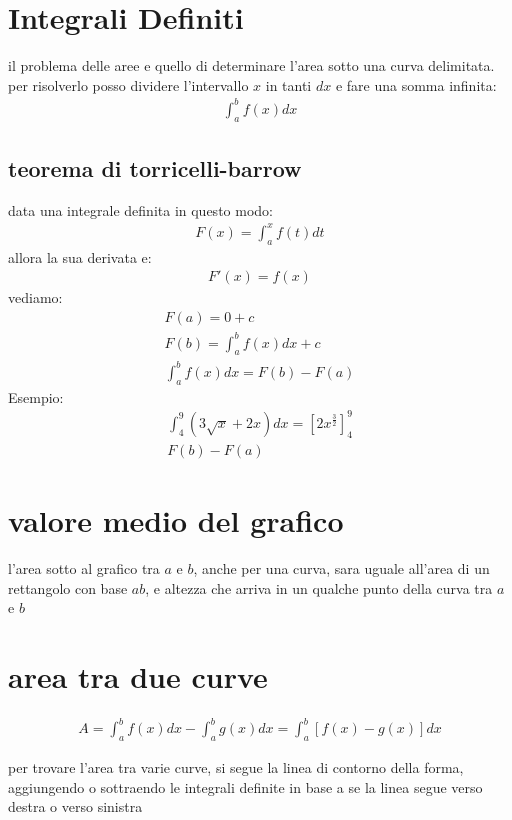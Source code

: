 \documentclass{article}
\begin{document}
\section{Integrali Definiti}
il problema delle aree e quello di determinare l'area sotto una curva delimitata. per risolverlo posso dividere l'intervallo $x$ in tanti $dx$ e fare una somma infinita:
\begin{gather*}
		\int_a^b f(x)dx
\end{gather*}
\subsection{teorema di torricelli-barrow}
data una integrale definita in questo modo:
\begin{gather*}
		F(x)=\int_a^x f(t)dt
\end{gather*}
allora la sua derivata e:
\begin{gather*}
		F'(x)=f(x)
\end{gather*}
vediamo:
\begin{gather*}
		F(a)=0+c\\
		F(b)=\int_a^b f(x)dx +c\\
		\int_a^b f(x)dx=F(b)-F(a)
\end{gather*}
Esempio:
\begin{gather*}
		\int_4^9 (3\sqrt{x}+2x)dx=\left[2x^{\frac{3}{2}}\right]_4^9\\
		F(b)-F(a)
\end{gather*}

\section{valore medio del grafico}

l'area sotto al grafico tra $a$ e $b$, anche per una curva, sara uguale all'area di un rettangolo con base $ab$, e altezza che arriva in un qualche punto della curva tra $a$ e $b$

\section{area tra due curve}

\begin{gather*}
A=\int_a^b f(x)dx - \int_a^b g(x)dx = \int_a^b \left[ f(x) - g(x)\right]dx
\end{gather*}

per trovare l'area tra varie curve, si segue la linea di contorno della forma, aggiungendo o sottraendo le integrali definite in base a se la linea segue verso destra o verso sinistra
\end{document}
